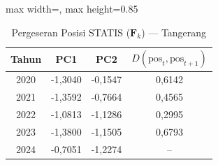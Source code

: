 \begin{table}[H]
\centering
\caption{Pergeseran Posisi STATIS ($\mathbf{F}_k$) --- Tangerang} \label{tab:app2jarak_statis_skor_tangerang}
\begin{adjustbox}{max width=\textwidth, max height=0.85\textheight}
\begin{tabular}{|c|c|c|c|}
\hline
\textbf{Tahun} & \textbf{PC1} & \textbf{PC2} & \textbf{$D(\text{pos}_t, \text{pos}_{t+1})$} \\
\hline
2020 & -1,3040 & -0,1547 & 0,6142 \\
2021 & -1,3592 & -0,7664 & 0,4565 \\
2022 & -1,0813 & -1,1286 & 0,2995 \\
2023 & -1,3800 & -1,1505 & 0,6793 \\
2024 & -0,7051 & -1,2274 & -- \\
\hline
\end{tabular}
\end{adjustbox}
\end{table}